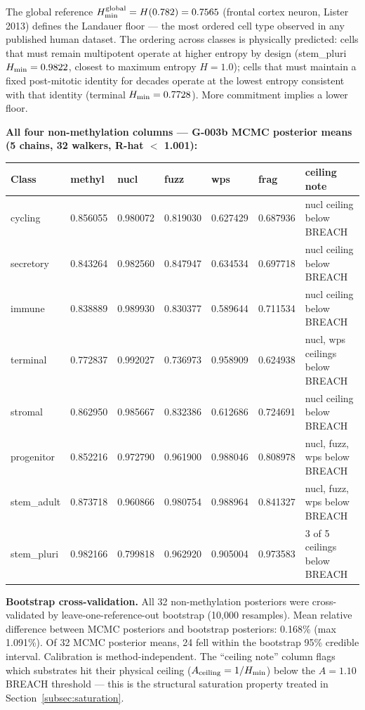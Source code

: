 \documentclass[12pt,a4paper]{article}
\begin{document}
\noindent The global reference $H_{\rm min}^{\rm global} = H(0.782) = 0.7565$
(frontal cortex neuron, Lister 2013) defines the Landauer floor --- the most
ordered cell type observed in any published human dataset. The ordering across
classes is physically predicted: cells that must remain multipotent operate at
higher entropy by design (stem\_pluri $H_{\rm min} = 0.9822$, closest to maximum
entropy $H = 1.0$); cells that must maintain a fixed post-mitotic identity for
decades operate at the lowest entropy consistent with that identity (terminal
$H_{\rm min} = 0.7728$). More commitment implies a lower floor.

\textbf{All four non-methylation columns --- G-003b MCMC posterior means
(5 chains, 32 walkers, R-hat $<$ 1.001):}

\begin{center}
\renewcommand{\arraystretch}{1.2}
\footnotesize
\begin{tabular}{lllllll}
\toprule
\textbf{Class} & \textbf{methyl} & \textbf{nucl} & \textbf{fuzz} & \textbf{wps} &
\textbf{frag} & \textbf{ceiling note} \\
\midrule
cycling     & 0.856055 & 0.980072 & 0.819030 & 0.627429 & 0.687936 & nucl ceiling below BREACH \\
secretory   & 0.843264 & 0.982560 & 0.847947 & 0.634534 & 0.697718 & nucl ceiling below BREACH \\
immune      & 0.838889 & 0.989930 & 0.830377 & 0.589644 & 0.711534 & nucl ceiling below BREACH \\
terminal    & 0.772837 & 0.992027 & 0.736973 & 0.958909 & 0.624938 & nucl, wps ceilings below BREACH \\
stromal     & 0.862950 & 0.985667 & 0.832386 & 0.612686 & 0.724691 & nucl ceiling below BREACH \\
progenitor  & 0.852216 & 0.972790 & 0.961900 & 0.988046 & 0.808978 & nucl, fuzz, wps below BREACH \\
stem\_adult  & 0.873718 & 0.960866 & 0.980754 & 0.988964 & 0.841327 & nucl, fuzz, wps below BREACH \\
stem\_pluri  & 0.982166 & 0.799818 & 0.962920 & 0.905004 & 0.973583 & 3 of 5 ceilings below BREACH \\
\bottomrule
\end{tabular}
\end{center}

\noindent \textbf{Bootstrap cross-validation.} All 32 non-methylation posteriors
were cross-validated by leave-one-reference-out bootstrap (10,000 resamples).
Mean relative difference between MCMC posteriors and bootstrap posteriors:
0.168\% (max 1.091\%). Of 32 MCMC posterior means, 24 fell within the bootstrap
95\% credible interval. Calibration is method-independent. The ``ceiling note''
column flags which substrates hit their physical ceiling
($A_{\rm ceiling} = 1/H_{\rm min}$) below the $A = 1.10$ BREACH threshold ---
this is the structural saturation property treated in
Section~\ref{subsec:saturation}.
\end{document}
